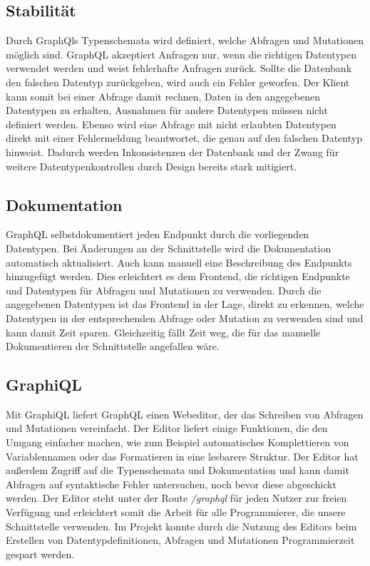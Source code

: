 \subsection{Stabilität}
Durch GraphQls Typenschemata wird definiert, welche Abfragen und Mutationen möglich sind.
GraphQL akzeptiert Anfragen nur, wenn die richtigen Datentypen verwendet werden und weist fehlerhafte Anfragen zurück.
Sollte die Datenbank den falschen Datentyp zurückgeben, wird auch ein Fehler geworfen.
Der Klient kann somit bei einer Abfrage damit rechnen, Daten in den angegebenen Datentypen zu erhalten, Ausnahmen für andere Datentypen müssen nicht definiert werden.
Ebenso wird eine Abfrage mit nicht erlaubten Datentypen direkt mit einer Fehlermeldung beantwortet, die genau auf den falschen Datentyp hinweist.
Dadurch werden Inkonsistenzen der Datenbank und der Zwang für weitere Datentypenkontrollen durch Design bereits stark mitigiert.

\subsection{Dokumentation}
GraphQL selbstdokumentiert jeden Endpunkt durch die vorliegenden Datentypen.
Bei Änderungen an der Schnittstelle wird die Dokumentation automatisch aktualisiert. Auch kann manuell eine Beschreibung des Endpunkts hinzugefügt werden. Dies erleichtert es dem Frontend, die richtigen Endpunkte und Datentypen für Abfragen und Mutationen zu verwenden. Durch die angegebenen Datentypen ist das Frontend in der Lage, direkt zu erkennen, welche Datentypen in der entsprechenden Abfrage oder Mutation zu verwenden sind und kann damit Zeit sparen.
Gleichzeitig fällt Zeit weg, die für das manuelle Dokumentieren der Schnittstelle angefallen wäre.

\subsection{GraphiQL}
Mit GraphiQL liefert GraphQL einen Webeditor, der das Schreiben von Abfragen und Mutationen vereinfacht.
Der Editor liefert einige Funktionen, die den Umgang einfacher machen, wie zum Beispiel automatisches Komplettieren von Variablennamen oder das Formatieren in eine lesbarere Struktur.
Der Editor hat außerdem Zugriff auf die Typenschemata und Dokumentation und kann damit Abfragen auf syntaktische Fehler untersuchen, noch bevor diese abgeschickt werden.
Der Editor steht unter der Route \textit{/graphql} für jeden Nutzer zur freien Verfügung und erleichtert somit die Arbeit für alle Programmierer, die unsere Schnittstelle verwenden.
Im Projekt konnte durch die Nutzung des Editors beim Erstellen von Datentypdefinitionen, Abfragen und Mutationen Programmierzeit gespart werden.

